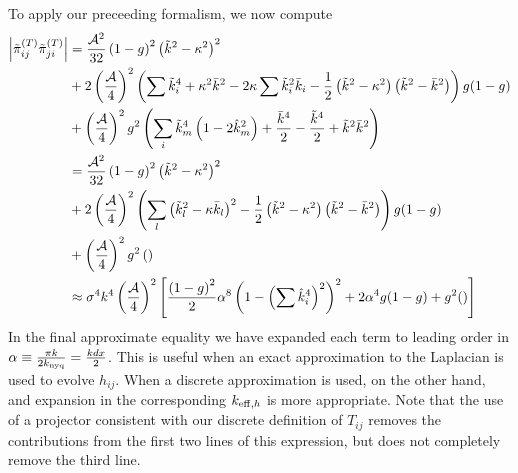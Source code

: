 \documentclass{revtex4}
\begin{document}
To apply our preceeding formalism, we now compute
\begin{align}
  \left|\tilde{\pi}^{(T)}_{ij}\tilde{\pi}_{ji}^{(T)}\right| &= \frac{\mathcal{A}^2}{32}\left(1-g\right)^2\left(\tilde{k}^2-\kappa^2\right)^2 \notag \\
  &+ 2\left(\frac{\mathcal{A}}{4}\right)^2\left(\sum\tilde{k}_i^4 + \kappa^2\bar{k}^2 - 2\kappa\sum\tilde{k}_i^2\bar{k}_i - \frac{1}{2}\left(\tilde{k}^2-\kappa^2\right)\left(\tilde{k}^2-\bar{k}^2\right) \right)g(1-g) \\
  &+ \left(\frac{\mathcal{A}}{4}\right)^2g^2\left(\sum_i\tilde{k}_m^4\left(1-2\hat{k}_m^2\right) + \frac{\bar{k}^4}{2} - \frac{\tilde{k}^4}{2} + \tilde{k}^2\bar{k}^2\right) \notag \\
  &= \frac{\mathcal{A}^2}{32}\left(1-g\right)^2\left(\tilde{k}^2-\kappa^2\right)^2 \notag \\
  &+ 2\left(\frac{\mathcal{A}}{4}\right)^2\left(\sum_l\left(\tilde{k}_l^2-\kappa\bar{k}_l\right)^2 - \frac{1}{2}\left(\tilde{k}^2-\kappa^2\right)\left(\tilde{k}^2-\bar{k}^2\right) \right)g(1-g) \notag \\
  &+ \left(\frac{\mathcal{A}}{4}\right)^2g^2\left(\right) \\
  &\approx \sigma^4k^4\left(\frac{\mathcal{A}}{4}\right)^2\left[\frac{\left(1-g\right)^2}{2}\alpha^8\left(1-\left(\sum\hat{k}_i^4\right)^2\right)^2 + 2\alpha^4g(1-g) + g^2() \right]
\end{align}
In the final approximate equality we have expanded each term to leading order in $\alpha \equiv \frac{\pi k}{2k_{\rm nyq}} = \frac{kdx}{2}$.
This is useful when an exact approximation to the Laplacian is used to evolve $h_{ij}$.
When a discrete approximation is used, on the other hand, and expansion in the corresponding $k_{{\rm eff},h}$ is more appropriate. 
Note that the use of a projector consistent with our discrete definition of $T_{ij}$ removes the contributions from the first two lines of this expression, but does not completely remove the third line.
\end{document}
